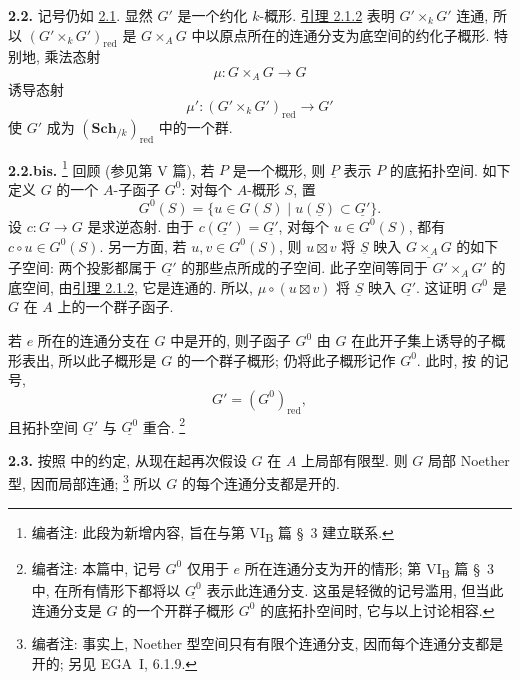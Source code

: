 \medskip
{}\label{par:sga3-VIA-2.2}%
\noindent\textbf{2.2.}
记号仍如 \hyperref[par:sga3-VIA-2.1]{2.1}.
显然 \(G'\) 是一个约化 \(k\)-概形.
\hyperref[lem:sga3-VIA-2.1.2]{引理 2.1.2} 表明 \(G'\times_kG'\) 连通,
所以 \((G'\times_kG')_{\mathrm{red}}\) 是 \(G\times_AG\)
中以原点所在的连通分支为底空间的约化子概形.
特别地, 乘法态射
\[
  \mu:G\times_AG\longrightarrow G
\]
诱导态射
\[
  \mu':(G'\times_kG')_{\mathrm{red}}\longrightarrow G'
\]
使 \(G'\) 成为 \((\mathbf{Sch}_{/k})_{\mathrm{red}}\) 中的一个群.

\medskip
{}\label{par:sga3-VIA-2.2bis}%
\noindent\textbf{2.2.bis.}%
\footnote{\label{note:sga3-VIA-20}编者注: 此段为新增内容,
旨在与第 VI\textsubscript{B} 篇 \S~3 建立联系.}
回顾 (参见第 V 篇), 若 \(P\) 是一个概形,
则 \(\underline P\) 表示 \(P\) 的底拓扑空间.
如下定义 \(G\) 的一个 \(A\)-子函子 \(G^0\):
对每个 \(A\)-概形 \(S\), 置
\[
  G^0(S)
    =\{u\in G(S)\mid u(\underline S)\subset\underline{G'}\}.
\]
设 \(c:G\to G\) 是求逆态射.
由于 \(c(\underline{G'})=\underline{G'}\),
对每个 \(u\in G^0(S)\), 都有 \(c\circ u\in G^0(S)\).
另一方面, 若 \(u,v\in G^0(S)\),
则 \(u\boxtimes v\) 将 \(\underline S\) 映入
\(\underline{G\times_AG}\) 的如下子空间:
两个投影都属于 \(\underline{G'}\) 的那些点所成的子空间.
此子空间等同于 \(G'\times_AG'\) 的底空间,
由\hyperref[lem:sga3-VIA-2.1.2]{引理 2.1.2}, 它是连通的.
所以, \(\mu\circ(u\boxtimes v)\) 将 \(\underline S\)
映入 \(\underline{G'}\).
这证明 \(G^0\) 是 \(G\) 在 \(A\) 上的一个群子函子.

若 \(e\) 所在的连通分支在 \(G\) 中是开的,
则子函子 \(G^0\) 由 \(G\) 在此开子集上诱导的子概形表出,
所以此子概形是 \(G\) 的一个群子概形;
仍将此子概形记作 \(G^0\).
此时, 按  的记号,
\[
  G'=(G^0)_{\mathrm{red}},
\]
且拓扑空间 \(\underline{G'}\) 与 \(\underline{G^0}\) 重合.%
\footnote{\label{note:sga3-VIA-21}编者注: 本篇中,
记号 \(G^0\) 仅用于 \(e\) 所在连通分支为开的情形;
第 VI\textsubscript{B} 篇 \S~3 中,
在所有情形下都将以 \(\underline{G^0}\) 表示此连通分支.
这虽是轻微的记号滥用, 但当此连通分支是
\(G\) 的一个开群子概形 \(G^0\) 的底拓扑空间时,
它与以上讨论相容.}

\medskip
{}\label{par:sga3-VIA-2.3}%
\noindent\textbf{2.3.}
按照  中的约定,
从现在起再次假设 \(G\) 在 \(A\) 上局部有限型.
则 \(G\) 局部 Noether 型, 因而局部连通;%
\footnote{\label{note:sga3-VIA-22}编者注: 事实上,
Noether 型空间只有有限个连通分支, 因而每个连通分支都是开的;
另见 EGA~I, 6.1.9.}
所以 \(G\) 的每个连通分支都是开的.

